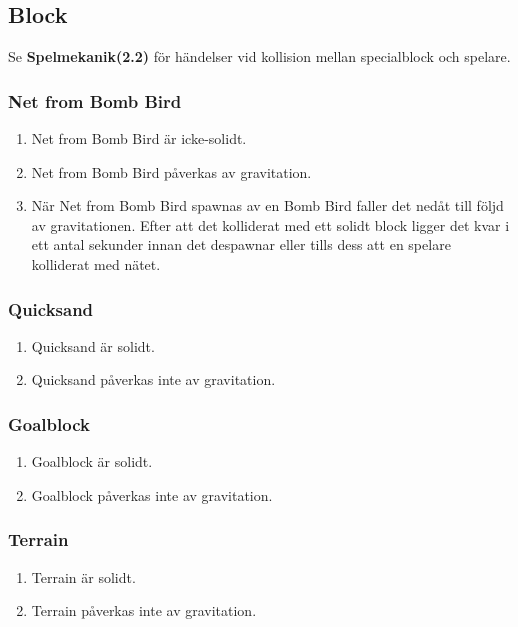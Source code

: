 \documentclass{TDP003mall}
\begin{document}
\subsection{Block}
Se \textbf{Spelmekanik(2.2)} för händelser vid kollision mellan specialblock och spelare.

\subsubsection{Net from Bomb Bird}
\begin{enumerate}
\item Net from Bomb Bird är icke-solidt.
\item Net from Bomb Bird påverkas av gravitation.
\item När Net from Bomb Bird spawnas av en Bomb Bird faller det nedåt till följd av gravitationen. Efter att det kolliderat med ett solidt block ligger det kvar i ett antal sekunder innan det despawnar eller tills dess att en spelare kolliderat med nätet.
\end{enumerate}

\subsubsection{Quicksand}
\begin{enumerate}
\item Quicksand är solidt.
\item Quicksand påverkas inte av gravitation.
\end{enumerate}

\subsubsection{Goalblock}
\begin{enumerate}
\item Goalblock är solidt.
\item Goalblock påverkas inte av gravitation.
\end{enumerate}

\subsubsection{Terrain}
\begin{enumerate}
\item Terrain är solidt.
\item Terrain påverkas inte av gravitation.
\end{enumerate}
\newpage
\end{document}
